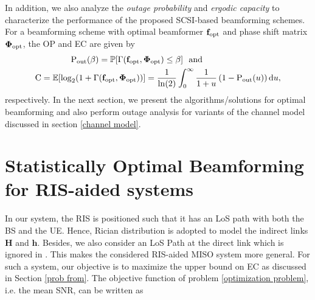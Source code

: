 \documentclass[journal,draftclsnofoot,onecolumn,12pt]{IEEEtran}
\begin{document}
In addition, we also analyze the \emph{outage probability} and \emph{ergodic capacity} to characterize the performance of the proposed SCSI-based beamforming schemes.
For a beamforming scheme with optimal beamformer $\mathbf{f}_{\rm opt}$ and phase shift matrix $\mathbf{\Phi}_{\rm opt}$, the OP and EC are given by
\begin{align}
    {\rm P_{out}}(\beta) &= \mathbb{P}[{\Gamma(\mathbf{f}_{\rm opt},\mathbf{\Phi}_{\rm opt})} \leq \beta]~~\text{and}\label{P_out}\\
      {\rm C} = \mathbb{E}[\log_2(1+\Gamma&(\mathbf{f}_{\rm opt},\mathbf{\Phi}_{\rm opt}))]=\frac{1}{\ln(2)}\int_0^\infty \frac{1}{1+u}\left(1-{\rm P_{out}}(u)\right){\rm d}u,\label{ergodic capacity}
\end{align}
respectively. In the next section, we present the algorithms/solutions for optimal beamforming and also perform outage analysis for variants of the channel model discussed in section \ref{channel model}.
\vspace{-.4cm}\section{Statistically Optimal Beamforming for RIS-aided systems }\label{optimal beamforming}\vspace{-.2cm}
In  our system, the RIS is positioned such that it has an LoS path with both the BS and the UE. Hence, Rician distribution is adopted to model the indirect links $\mathbf{H}$ and $\mathbf{h}$. Besides, we also consider an LoS Path at the direct link which is ignored in \cite{WangJinghe_CorrelatedFading_2021}. This makes the considered RIS-aided MISO system more general. 
For such a system, our objective is to maximize the upper bound on EC as discussed in Section \ref{prob from}. The objective function of problem \eqref{optimization problem}, i.e. the mean {\rm SNR}, can be written as
\end{document}
